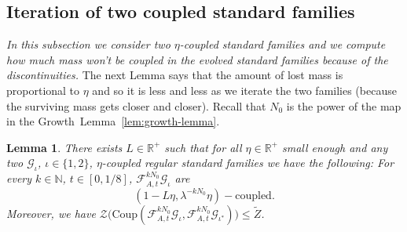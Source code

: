 \documentclass{amsart}
\numberwithin{equation}{section}
\newtheorem{lemma}[theorem]{Lemma}
\renewcommand{\le}{\leqslant}
\newcommand\cF{{\mathcal F}}
\newcommand\cG{{\mathcal G}}
\newcommand\cZ{{\mathcal Z}}
\newcommand\bN{{\mathbb N}}
\newcommand\bR{{\mathbb R}}
\newcommand{\catt}{\cF_{A,t}}
\newcommand{\Coup}{\text{Coup}}
\begin{document}
\subsection{Iteration of two coupled standard families} \label{subsec:iteration} \textit{In this subsection we consider two \(\eta\)-coupled standard families and we compute how much mass won't be coupled in the evolved standard families because of the discontinuities.} The next Lemma says that the amount of lost mass is proportional to \(\eta\) and so it is less and less as we iterate the two families (because the surviving mass gets closer and closer). Recall that \(N_0\) is the power of the map in the \mbox{Growth Lemma \ref{lem:growth-lemma}.}
\begin{lemma}\label{lem:push-sf}
 There exists \(L \in \bR^+\) such that for all \(\eta \in \bR^+\) small enough and any two \(\cG_{\iota}\), \(\iota \in \{1,2\}\), \(\eta\)-coupled regular standard families we have the following: For every \(k \in \bN\), \(t \in [0,1/8]\), \(\catt^{k N_0}\cG_{\iota}\) are 
\[
(1-L\eta, \lambda^{-kN_0}\eta)-\text{coupled}.
\]
Moreover, we have \(\cZ\bigl(\Coup (\catt^{k N_0}\cG_\iota, \catt^{k N_0} \cG_{\iota^*})\bigr) \le \widetilde Z\).
\end{lemma}
\end{document}
